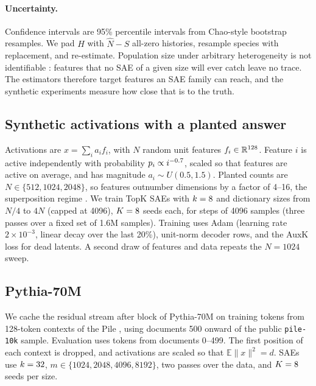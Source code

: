 \paragraph{Uncertainty.} Confidence intervals are 95\% percentile intervals from \BootN{} Chao-style bootstrap resamples. We pad $H$ with $\hat N-S$ all-zero histories, resample species with replacement, and re-estimate. Population size under arbitrary heterogeneity is not identifiable \citep{link2003nonidentifiability}: features that no SAE of a given size will ever catch leave no trace. The estimators therefore target features an SAE family can reach, and the synthetic experiments measure how close that is to the truth.

\subsection{Synthetic activations with a planted answer}
Activations are $x=\sum_i a_i f_i$, with $N$ random unit features $f_i\in\mathbb R^{128}$. Feature $i$ is active independently with probability $p_i\propto i^{-0.7}$, scaled so that \SynMeanActive{} features are active on average, and has magnitude $a_i\sim U(0.5,1.5)$. Planted counts are $N\in\{512,1024,2048\}$, so features outnumber dimensions by a factor of 4--16, the superposition regime \citep{elhage2022toy}. We train TopK SAEs \citep{gao2024scaling} with $k=8$ and dictionary sizes from $N/4$ to $4N$ (capped at 4096), $K=8$ seeds each, for \SynSteps{} steps of 4096 samples (three passes over a fixed set of 1.6M samples). Training uses Adam (learning rate $2\times10^{-3}$, linear decay over the last 20\%), unit-norm decoder rows, and the AuxK loss for dead latents. A second draw of features and data repeats the $N=1024$ sweep.

\subsection{Pythia-70M}
We cache the residual stream after block \RealLayer{} of Pythia-70M \citep{biderman2023pythia} on \RealTrainTokens{} training tokens from 128-token contexts of the Pile \citep{gao2020pile}, using documents 500 onward of the public \texttt{pile-10k} sample. Evaluation uses \RealEvalTokens{} tokens from documents 0--499. The first position of each context is dropped, and activations are scaled so that $\mathbb E\|x\|^2=d$. SAEs use $k=32$, $m\in\{1024,2048,4096,8192\}$, two passes over the data, and $K=8$ seeds per size.
